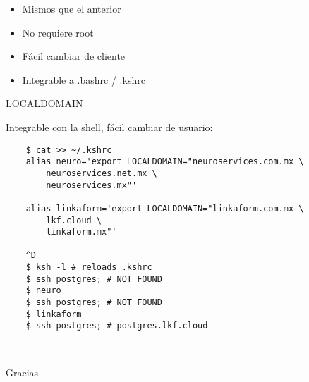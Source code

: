\documentclass[11pt,spanish]{article}
\newcommand{\rowsp}[1][1em]{\vspace{#1}}
\newcommand{\hone}[1]{{\rowsp[0.3em]\noindent\Large #1 \rowsp[0.3em]}}
\newcommand{\myitm}[1]{\begin{itemize}#1\end{itemize}}
\newcommand{\pros}{\item[pros:]}
\begin{document}
\myitm{
	\pros Mismos que el anterior
	\pros No requiere root
	\pros Fácil cambiar de cliente
	\pros Integrable a .bashrc / .kshrc
}

\newpage %

\hone{LOCALDOMAIN}

Integrable con la shell, fácil cambiar de usuario:

\begin{lstlisting}
	$ cat >> ~/.kshrc
	alias neuro='export LOCALDOMAIN="neuroservices.com.mx \
		neuroservices.net.mx \
		neuroservices.mx"'

	alias linkaform='export LOCALDOMAIN="linkaform.com.mx \
		lkf.cloud \
		linkaform.mx"'

	^D
	$ ksh -l # reloads .kshrc
	$ ssh postgres; # NOT FOUND
	$ neuro
	$ ssh postgres; # NOT FOUND
	$ linkaform
	$ ssh postgres; # postgres.lkf.cloud
\end{lstlisting}

\newpage %
\ 
\begin{center}
\hone{Gracias}
\end{center}
\vspace{\stretch{1}}

\label{lastpage}
\end{document}
